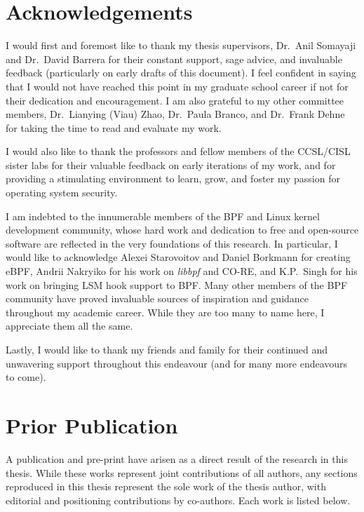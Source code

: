 \documentclass[
  fontsize=12pt,
  titlepage=firstiscover,
  paper=letter,
  oneside,
  cleardoublepage=plain,
  parskip=half-,
  DIV=10,
  parindent,
  appendixprefix,
  chapterprefix,
  listof=totoc,
]{scrbook}
\begin{document}
\endgroup
\cleardoublepage%

\chapter*{Acknowledgements}%
%
\begingroup
\small
\enlargethispage{2\baselineskip}
I would first and foremost like to thank my thesis supervisors, Dr.\ Anil
Somayaji and Dr.\ David Barrera for their constant support, sage advice, and
invaluable feedback (particularly on early drafts of this document). I feel
confident in saying that I would not have reached this point in my graduate
school career if not for their dedication and encouragement. I am also grateful
to my other committee members, Dr.\ Lianying (Viau) Zhao, Dr.\ Paula Branco, and
Dr.\ Frank Dehne for taking the time to read and evaluate my work.

I would also like to thank the professors and fellow members of the CCSL/CISL
sister labs for their valuable feedback on early iterations of my work, and for
providing a stimulating environment to learn, grow, and foster my passion for
operating system security.

I am indebted to the innumerable members of the BPF and Linux kernel
development community, whose hard work and dedication to free and open-source
software are reflected in the very foundations of this research. In particular, I
would like to acknowledge Alexei Starovoitov and Daniel Borkmann for creating
eBPF, Andrii Nakryiko for his work on \textit{libbpf} and CO-RE, and K.P.\ Singh
for his work on bringing LSM hook support to BPF\@. Many other members of the
BPF community have proved invaluable sources of inspiration and guidance
throughout my academic career. While they are too many to name here, I
appreciate them all the same.

Lastly, I would like to thank my friends and family for their continued and
unwavering support throughout this endeavour (and for many more endeavours to
come).
\endgroup
\cleardoublepage%

\chapter*{Prior Publication}%
%
\begingroup
\small
A publication and pre-print have arisen as a direct result of the research in this thesis.
While these works represent joint contributions of all authors, any sections reproduced in
this thesis represent the sole work of the thesis author, with editorial and positioning
contributions by co-authors. Each work is listed below.
\end{document}
